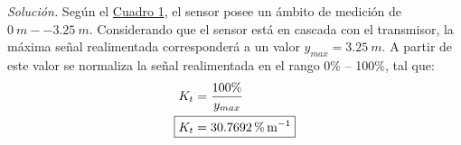 \textit{Solución.} Según el \hyperref[t1]{Cuadro 1}, el sensor posee un ámbito de medición de $ \SI{0}{m} -- \SI{3.25}{m}$. Considerando que el sensor está en cascada con el transmisor, la máxima señal realimentada corresponderá a un valor $y _{max} = \SI{3.25}{m}$. A partir de este valor se normaliza la señal realimentada en el rango 0\% -- 100\%, tal que:
\begin{align*}
    K _{t}  &= \frac{100\%}{y _{max}}\\
    \Aboxed{K _{t}&= \SI{30.7692}{\percent\per\metre}}
\end{align*}


